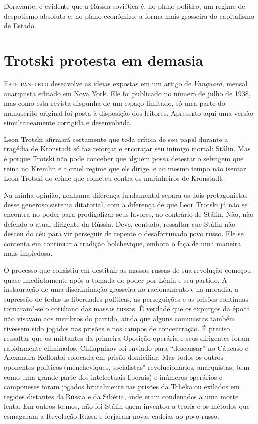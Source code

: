 Doravante, é evidente que a Rússia soviética é, no plano político, um
regime de despotismo absoluto e, no plano econômico, a forma mais
grosseira do capitalismo de Estado.


\chapter{Trotski protesta em demasia}

\textsc{Este panfleto} desenvolve as ideias expostas em um artigo de \textit{Vanguard},
mensal anarquista editado em Nova York. Ele foi publicado no número de
julho de 1938, mas como esta revista dispunha de um espaço limitado, só
uma parte do manuscrito original foi posta à disposição dos leitores.
Apresento aqui uma versão simultaneamente corrigida e desenvolvida.

Leon Trotski afirmará certamente que toda crítica de seu papel durante a
tragédia de Kronstadt só faz reforçar e encorajar seu inimigo mortal:
Stálin. Mas é porque Trotski não pode conceber que alguém possa
detestar o selvagem que reina no Kremlin e o cruel regime que ele
dirige, e ao mesmo tempo não isentar Leon Trotski do crime que
cometeu contra os marinheiros de Kronstadt.

Na minha opinião, nenhuma diferença fundamental separa os dois
protagonistas desse generoso sistema ditatorial, com a diferença de que
Leon Trotski já não se encontra no poder para prodigalizar seus
favores, ao contrário de Stálin. Não, não defendo o atual
dirigente da Rússia. 
Devo, contudo, ressaltar que Stálin não desceu do céu para vir perseguir
de repente o desafortunado povo russo. Ele se contenta em continuar a
tradição bolchevique, embora o faça de uma maneira mais impiedosa.

O processo que consistiu em destituir as massas russas de sua revolução
começou quase imediatamente após a tomada do poder por Lênin e seu
partido. A instauração de uma discriminação grosseira no racionamento
e na moradia, a supressão de todas as liberdades políticas, as
perseguições e as prisões contínuas tornaram"-se o cotidiano das
massas russas.
É verdade que os expurgos da época não visavam aos membros do partido,
ainda que alguns comunistas também tivessem sido jogados nas prisões e
nos campos de concentração. É preciso ressaltar que os militantes da
primeira Oposição operária e seus dirigentes foram rapidamente
eliminados. Chliapnikov foi enviado para “descansar” no Cáucaso e Alexandra
Kollontai colocada em prisão domiciliar.
Mas todos os outros oponentes políticos (mencheviques,
socialistas"-revolucionários, anarquistas, bem como uma grande parte
dos intelectuais liberais) e inúmeros operários e camponeses foram
jogados brutalmente nas prisões da Tcheka ou exilados em regiões
distantes da Rússia e da Sibéria, onde eram condenados a uma morte
lenta.
Em outros termos, não foi Stálin quem inventou a teoria e os métodos que
esmagaram a Revolução Russa e forjaram novas cadeias ao povo russo.

